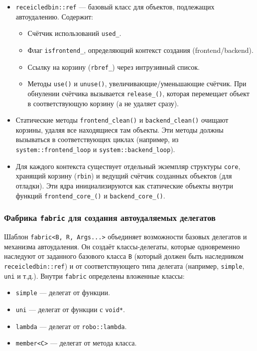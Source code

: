 \documentclass[a4paper,12pt]{article}
\begin{document}
\begin{itemize}
    \item \texttt{receicledbin::ref} — базовый класс для объектов, подлежащих автоудалению. Содержит:
        \begin{itemize}
            \item Счётчик использований \texttt{used\_}.
            \item Флаг \texttt{isfrontend\_}, определяющий контекст создания (frontend/backend).
            \item Ссылку на корзину (\texttt{rbref\_}) через интрузивный список.
            \item Методы \texttt{use()} и \texttt{unuse()}, увеличивающие/уменьшающие счётчик. При обнулении счётчика вызывается \texttt{release\_()}, которая перемещает объект в соответствующую корзину (а не удаляет сразу).
        \end{itemize}
    \item Статические методы \texttt{frontend\_clean()} и \texttt{backend\_clean()} очищают корзины, удаляя все находящиеся там объекты. Эти методы должны вызываться в соответствующих циклах (например, из \texttt{system::frontend\_loop} и \texttt{system::backend\_loop}).
    \item Для каждого контекста существует отдельный экземпляр структуры \texttt{core}, хранящий корзину (\texttt{rbin}) и ведущий счётчик созданных объектов (для отладки). Эти ядра инициализируются как статические объекты внутри функций \texttt{frontend\_core\_()} и \texttt{backend\_core\_()}.
\end{itemize}

\subsubsection{Фабрика \texttt{fabric} для создания автоудаляемых делегатов}

Шаблон \texttt{fabric<B, R, Args...>} объединяет возможности базовых делегатов и механизма автоудаления. Он создаёт классы-делегаты, которые одновременно наследуют от заданного базового класса \texttt{B} (который должен быть наследником \texttt{receicledbin::ref}) и от соответствующего типа делегата (например, \texttt{simple}, \texttt{uni} и т.д.). Внутри \texttt{fabric} определены вложенные классы:

\begin{itemize}
    \item \texttt{simple} — делегат от функции.
    \item \texttt{uni} — делегат от функции с \texttt{void*}.
    \item \texttt{lambda} — делегат от \texttt{robo::lambda}.
    \item \texttt{member<C>} — делегат от метода класса.
\end{itemize}
\end{document}
